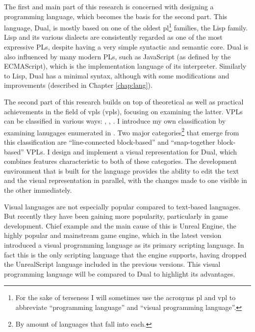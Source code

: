 The first and main part of this research is concerned with designing a programming language, which becomes the basis for the second part. This language, Dual, is mostly based on one of the oldest \acrshort{pl}\footnote{For the sake of terseness I will sometimes use the acronyms \acrshort{pl} and \acrshort{vpl} to abbreviate ``programming language'' and ``visual programming language''.} families, the Lisp\cite{lisp_draft, lisp_wikipedia} family. Lisp and its various dialects are consistently regarded as one of the most expressive PLs\cite{lisp_expressive, lisp_powerful}, despite having a very simple syntactic and semantic core\cite{lisp_simple}. Dual is also influenced by many modern PLs, such as JavaScript (as defined by the ECMAScript\cite{ecmascript}), which is the implementation language of its interpreter. Similarly to Lisp, Dual has a minimal syntax, although with some modifications and improvements (described in Chapter \ref{chap:lang}). 

The second part of this research builds on top of theoretical\cite{visual_languages} as well as practical\cite{snapshots} achievements in the field of \acrlong{vpl}s (\acrshort{vpl}s), focusing on examining the latter. VPLs can be classified in various ways: \cite[Section~VPL-II.B]{visual_languages}, \cite[Section~Types~of~VPLs]{vpl_maturity}, \cite[Section~Definition]{vpl_wikipedia}. I introduce my own classification by examining lanugages enumerated in \cite{snapshots}. Two major categories\footnote{By amount of languages that fall into each.} that emerge from this classification are ``line-connected block-based'' and ``snap-together block-based'' VPLs. I design and implement a visual representation for Dual, which combines features characteristic to both of these categories. The development environment that is built for the language provides the ability to edit the text and the visual representation in parallel, with the changes made to one visible in the other immediately.

Visual languages are not especially popular compared to text-based languages. But recently they have been gaining more popularity, particularly in game development. Chief example and the main cause of this is Unreal Engine, the highly popular and mainstream\cite{unreal_list, unreal_guinness} game engine, which in the latest version introduced a visual programming language\cite{blueprint} as its primary scripting language. In fact this is the only scripting language that the engine supports, having dropped the UnrealScript language\cite{unreal_script} included in the previous versions. This visual programming language will be compared to Dual to highlight its advantages.

